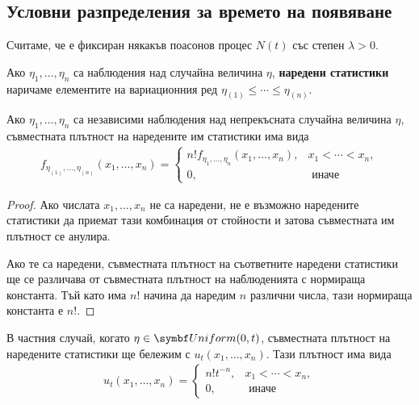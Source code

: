 \documentclass{../../common/topic}
\begin{document}
\subsection{Условни разпределения за времето на появяване}

Считаме, че е фиксиран някакъв поасонов процес \( N(t) \) със степен \( \lambda > 0 \).

\begin{definition}
  Ако \( \eta_1, \ldots, \eta_n \) са наблюдения над случайна величина \( \eta \), \textbf{наредени статистики} наричаме елементите на вариационния ред \( \eta_{(1)} \leq \cdots \leq \eta_{(n)} \).
\end{definition}

\begin{proposition}
  Ако \( \eta_1, \ldots, \eta_n \) са независими наблюдения над непрекъсната случайна величина \( \eta \), съвместната плътност на наредените им статистики има вида
  \begin{align*}
    f_{\eta_{(1)}, \ldots, \eta_{(n)}} (x_1, \ldots, x_n)
    =
    \begin{cases}
      n! f_{\eta_{1}, \ldots, \eta_{n}} (x_1, \ldots, x_n), &x_1 < \cdots < x_n, \\
      0, &\text{ иначе}
    \end{cases}
  \end{align*}
\end{proposition}
\begin{proof}
  Ако числата \( x_1, \ldots, x_n \) не са наредени, не е възможно наредените статистики да приемат тази комбинация от стойности и затова съвместната им плътност се анулира.

  Ако те са наредени, съвместната плътност на съответните наредени статистики ще се различава от съвместната плътност на наблюденията с нормираща константа. Тъй като има \( n \)! начина да наредим \( n \) различни числа, тази нормираща константа е \( n \)!.
\end{proof}

\begin{remark}
  В частния случай, когато \( \eta \in \distr{Uniform}(0, t) \), съвместната плътност на наредените статистики ще бележим с \( u_t(x_1, \ldots, x_n) \). Тази плътност има вида
  \begin{align*}
    u_t(x_1, \ldots, x_n)
    =
    \begin{cases}
      n! t^{-n}, &x_1 < \cdots < x_n, \\
      0, &\text{ иначе}
    \end{cases}
  \end{align*}
\end{remark}
\end{document}
